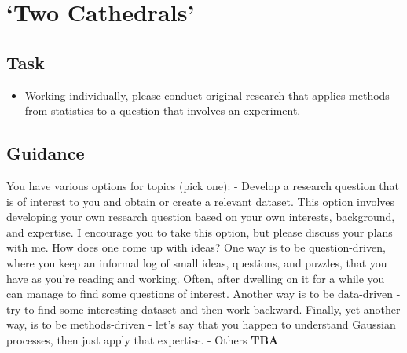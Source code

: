 \documentclass[
]{book}
\providecommand{\tightlist}{%
  \setlength{\itemsep}{0pt}\setlength{\parskip}{0pt}}
\begin{document}
\hypertarget{two-cathedrals}{%
\section{`Two Cathedrals'}\label{two-cathedrals}}

\hypertarget{task-3}{%
\subsection{Task}\label{task-3}}

\begin{itemize}
\tightlist
\item
  Working individually, please conduct original research that applies methods from statistics to a question that involves an experiment.
\end{itemize}

\hypertarget{guidance-3}{%
\subsection{Guidance}\label{guidance-3}}

You have various options for topics (pick one):
- Develop a research question that is of interest to you and obtain or create a relevant dataset. This option involves developing your own research question based on your own interests, background, and expertise. I encourage you to take this option, but please discuss your plans with me. How does one come up with ideas? One way is to be question-driven, where you keep an informal log of small ideas, questions, and puzzles, that you have as you're reading and working. Often, after dwelling on it for a while you can manage to find some questions of interest. Another way is to be data-driven - try to find some interesting dataset and then work backward. Finally, yet another way, is to be methods-driven - let's say that you happen to understand Gaussian processes, then just apply that expertise.
- Others \textbf{TBA}
\end{document}
